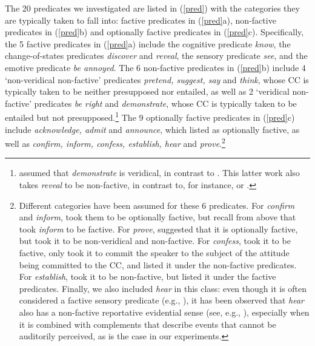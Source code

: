\documentclass[11pt,fleqn]{article}
\newcommand{\6}{\mbox{$[\hspace*{-.6mm}[$}}
\newcommand{\9}{\mbox{$]\hspace*{-.6mm}]$}}
\begin{document}
The 20 predicates we investigated are listed in (\ref{pred}) with the categories they are typically taken to fall into: factive predicates in (\ref{pred}a), non-factive predicates in (\ref{pred}b) and optionally factive predicates in (\ref{pred}c). Specifically, the 5 factive predicates in (\ref{pred}a) include the cognitive predicate {\em know}, the change-of-states predicates {\em discover} and {\em reveal}, the sensory predicate {\em see}, and the emotive predicate {\em be annoyed}. The 6 non-factive predicates in (\ref{pred}b) include 4 `non-veridical non-factive' predicates {\em pretend, suggest, say} and {\em think}, whose CC is typically taken to be neither presupposed nor entailed, as well as  2 `veridical non-factive' predicates {\em be right} and {\em demonstrate}, whose CC is typically taken to be entailed but not presupposed.\footnote{\citet{anand-hacquard2014} assumed that {\em demonstrate} is veridical, in contrast to \citealt{anand-etal2019}. This latter work also takes {\em reveal} to be non-factive, in contrast to, for instance, \citealt{egre2008,wyse} or \citealt{tbd-variability}.}  The 9 optionally factive predicates in (\ref{pred}c) include {\em acknowledge, admit} and {\em announce}, which \citealt{kiparsky-kiparsky70} listed as optionally factive, as well as {\em confirm, inform, confess, establish, hear} and {\em prove}.\footnote{Different categories have been assumed for these 6 predicates. For {\em confirm} and {\em inform}, \citet{anand-hacquard2014} took them to be optionally factive, but recall from above that \citet{schlenker10} took {\em inform} to be factive. For {\em prove}, \citet{white-rawlins-nels2018} suggested that it is optionally factive, but \citet{anand-hacquard2014} took it to be non-veridical and non-factive. For {\em confess}, \citet{swanson2012} took it to be factive, \citet{karttunen2016} only took it to commit the speaker to the subject of the attitude being committed to the CC, and \citet{wyse} listed it under the non-factive predicates. For {\em establish}, \citet{swanson2012} took it to be non-factive, but \citet{wyse} listed it under the factive predicates. Finally, we also included {\em hear} in this class: even though it is often considered a factive sensory predicate (e.g., \citealt{beaver-belly,anand-hacquard2014}), it has been observed that {\em hear} also has a non-factive reportative evidential sense (see, e.g., \citealt{anderson86,simons07}), especially when it is combined with complements that describe events that cannot be auditorily perceived, as is the case in our experiments.}
\end{document}
